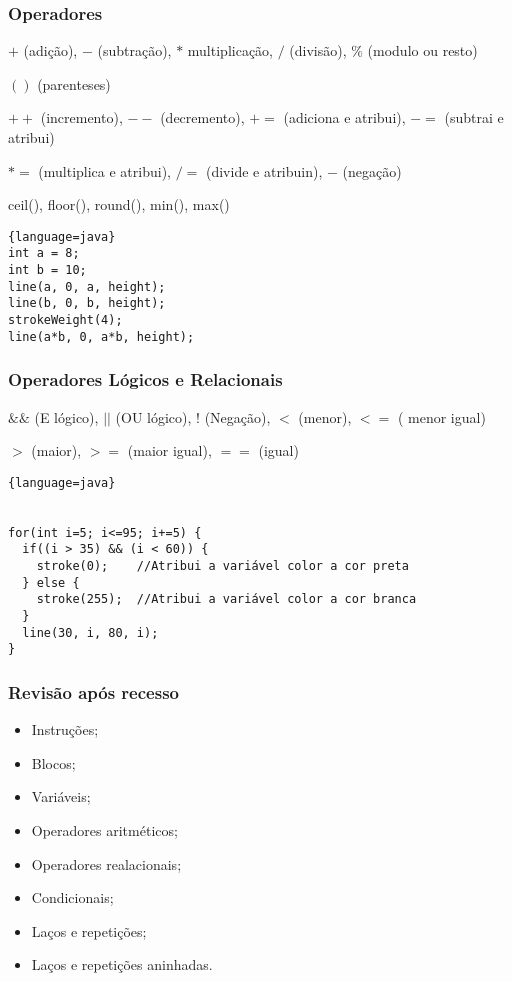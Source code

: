 \documentclass{beamer}
\begin{document}
\begin{frame}[fragile]
\frametitle{Operadores}
\scriptsize
$+$ (adição), $-$ (subtração), $*$ multiplicação, $/$ (divisão), $\%$ (modulo ou resto)

$()$ (parenteses)

$++$ (incremento), $--$ (decremento), $+=$ (adiciona e atribui), $-=$ (subtrai e atribui)

$*=$ (multiplica e atribui), $/=$ (divide e atribuin), $-$ (negação)

ceil(), floor(), round(), min(), max()

\normalsize

\begin{lstlisting}{language=java}
int a = 8;
int b = 10;
line(a, 0, a, height);
line(b, 0, b, height);
strokeWeight(4);
line(a*b, 0, a*b, height);
\end{lstlisting}
\end{frame}


\begin{frame}[fragile]
\frametitle{Operadores Lógicos e Relacionais}
\scriptsize
$\&\&$ (E lógico), $||$ (OU lógico), $!$ (Negação), $<$ (menor), $<=$ ( menor igual)

$>$ (maior), $>=$ (maior igual), $==$ (igual)

\normalsize

\begin{lstlisting}{language=java}
 	

for(int i=5; i<=95; i+=5) { 
  if((i > 35) && (i < 60)) { 
    stroke(0);    //Atribui a variável color a cor preta
  } else { 
    stroke(255);  //Atribui a variável color a cor branca
  } 
  line(30, i, 80, i); 
} 

\end{lstlisting}
\end{frame}

\begin{frame}
\frametitle{Revisão após recesso}
\begin{itemize}
 \item Instruções;
 \item Blocos; 
 \item Variáveis;
 \item Operadores aritméticos;
 \item Operadores realacionais;
 \item Condicionais;
 \item Laços e repetições;
 \item Laços e repetições aninhadas. 
\end{itemize}
\end{frame}
\end{document}
